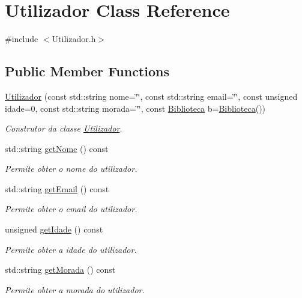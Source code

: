 \hypertarget{classUtilizador}{}\section{Utilizador Class Reference}
\label{classUtilizador}


{\ttfamily \#include $<$Utilizador.\+h$>$}

\subsection*{Public Member Functions}
\begin{DoxyCompactItemize}
\item 
\hyperlink{classUtilizador_ac4d4e41d09c17ea0b1c5bf4bcda4b6a8}{Utilizador} (const std\+::string nome=\char`\"{}\char`\"{}, const std\+::string email=\char`\"{}\char`\"{}, const unsigned idade=0, const std\+::string morada=\char`\"{}\char`\"{}, const \hyperlink{classBiblioteca}{Biblioteca} b=\hyperlink{classBiblioteca}{Biblioteca}())
\begin{DoxyCompactList}\small\item\em Construtor da classe \hyperlink{classUtilizador}{Utilizador}. \end{DoxyCompactList}\item 
std\+::string \hyperlink{classUtilizador_a82874cffab116aa572f58576511b0e24}{get\+Nome} () const
\begin{DoxyCompactList}\small\item\em Permite obter o nome do utilizador. \end{DoxyCompactList}\item 
std\+::string \hyperlink{classUtilizador_aea88bb297704762d0cccc909b8c2da54}{get\+Email} () const
\begin{DoxyCompactList}\small\item\em Permite obter o email do utilizador. \end{DoxyCompactList}\item 
unsigned \hyperlink{classUtilizador_adff93f098f9512263fcbd1cdadf20855}{get\+Idade} () const
\begin{DoxyCompactList}\small\item\em Permite obter a idade do utilizador. \end{DoxyCompactList}\item 
std\+::string \hyperlink{classUtilizador_aea27372a36fb8e59d2f3029464d83101}{get\+Morada} () const
\begin{DoxyCompactList}\small\item\em Permite obter a morada do utilizador. \end{DoxyCompactList}\item 

\end{DoxyCompactItemize}
